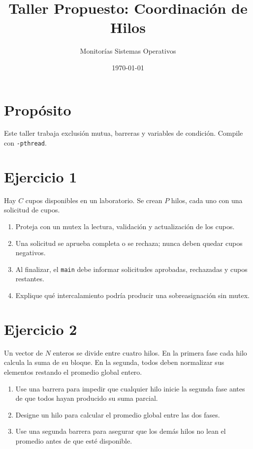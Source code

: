 \documentclass[12pt,a4paper]{article}
\title{\textbf{Taller Propuesto: Coordinación de Hilos}}
\author{Monitorías Sistemas Operativos}
\date{\today}
\begin{document}
\maketitle

\section*{Propósito}
Este taller trabaja exclusión mutua, barreras y variables de condición. Compile con \texttt{-pthread}.

\section*{Ejercicio 1}
Hay $C$ cupos disponibles en un laboratorio. Se crean $P$ hilos, cada uno con una solicitud de cupos.
\begin{enumerate}
    \item Proteja con un mutex la lectura, validación y actualización de los cupos.
    \item Una solicitud se aprueba completa o se rechaza; nunca deben quedar cupos negativos.
    \item Al finalizar, el \texttt{main} debe informar solicitudes aprobadas, rechazadas y cupos restantes.
    \item Explique qué intercalamiento podría producir una sobreasignación sin mutex.
\end{enumerate}

\section*{Ejercicio 2}
Un vector de $N$ enteros se divide entre cuatro hilos. En la primera fase cada hilo calcula la suma de su bloque. En la segunda, todos deben normalizar sus elementos restando el promedio global entero.
\begin{enumerate}
    \item Use una barrera para impedir que cualquier hilo inicie la segunda fase antes de que todos hayan producido su suma parcial.
    \item Designe un hilo para calcular el promedio global entre las dos fases.
    \item Use una segunda barrera para asegurar que los demás hilos no lean el promedio antes de que esté disponible.
\end{enumerate}
\end{document}
